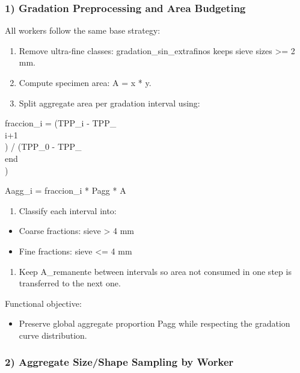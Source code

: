﻿\documentclass[11pt,a4paper]{article}
\begin{document}
\subsubsection*{1) Gradation Preprocessing and Area Budgeting}

All workers follow the same base strategy:


\begin{enumerate}
\item Remove ultra-fine classes: gradation\_sin\_extrafinos keeps sieve sizes >= 2 mm.
\item Compute specimen area: A = x * y.
\item Split aggregate area per gradation interval using:
\end{enumerate}
fraccion\_i = (TPP\_i - TPP\_\\{i+1\\}) / (TPP\_0 - TPP\_\\{end\\})

Aagg\_i = fraccion\_i * Pagg * A

\begin{enumerate}
\item Classify each interval into:
\end{enumerate}
\begin{itemize}
\item Coarse fractions: sieve > 4 mm
\item Fine fractions: sieve <= 4 mm
\end{itemize}
\begin{enumerate}
\item Keep A\_remanente between intervals so area not consumed in one step is transferred to the next one.
\end{enumerate}

Functional objective:

\begin{itemize}
\item Preserve global aggregate proportion Pagg while respecting the gradation curve distribution.
\end{itemize}

\subsubsection*{2) Aggregate Size/Shape Sampling by Worker}
\end{document}
